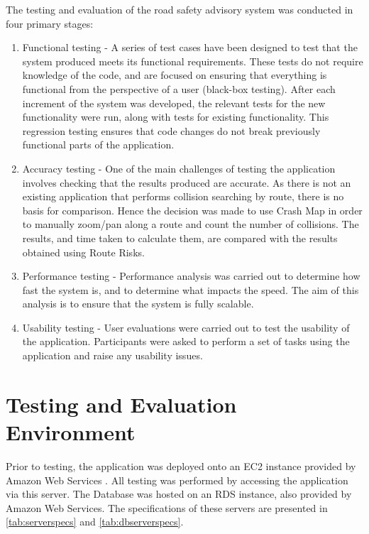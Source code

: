 \documentclass[authoryearcitations]{UoYCSproject}
\begin{document}
The testing and evaluation of the road safety advisory system was conducted in four primary stages:

\begin{enumerate}
	\item Functional testing - A series of test cases have been designed to test that the system produced meets its functional requirements. These tests do not require knowledge of the code, and are focused on ensuring that everything is functional from the perspective of a user (black-box testing). After each increment of the system was developed, the relevant tests for the new functionality were run, along with tests for existing functionality. This regression testing ensures that code changes do not break previously functional parts of the application.
	\item Accuracy testing - One of the main challenges of testing the application involves checking that the results produced are accurate. As there is not an existing application that performs collision searching by route, there is no basis for comparison. Hence the decision was made to use Crash Map \citep{crashmap} in order to manually zoom/pan along a route and count the number of collisions. The results, and time taken to calculate them, are compared with the results obtained using Route Risks.
	\item Performance testing -  Performance analysis was carried out to determine how fast the system is, and to determine what impacts the speed. The aim of this analysis is to ensure that the system is fully scalable. 
	\item Usability testing - User evaluations were carried out to test the usability of the application. Participants were asked to perform a set of tasks using the application and raise any usability issues.
\end{enumerate}

\section{Testing and Evaluation Environment}

Prior to testing, the application was deployed onto an EC2 instance provided by Amazon Web Services \citep{AmazonWebServices}. All testing was performed by accessing the application via this server. The Database was hosted on an RDS instance, also provided by Amazon Web Services. The specifications of these servers are presented in \autoref{tab:serverspecs} and \autoref{tab:dbserverspecs}.
\end{document}
